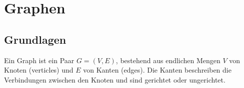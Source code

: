 \section{Graphen}
\subsection{Grundlagen}
\begin{definition}[Graph]
	Ein Graph ist ein Paar $G=(V,E)$, bestehend aus endlichen Mengen $V$ von Knoten (verticles) und $E$ von Kanten (edges).
	Die Kanten beschreiben die Verbindungen zwischen den Knoten und sind gerichtet oder ungerichtet.
\end{definition}
